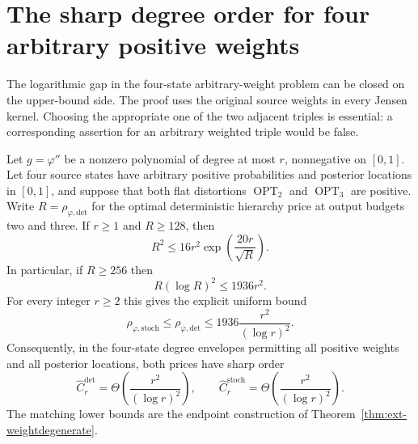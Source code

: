 \section{The sharp degree order for four arbitrary positive weights}
\label{sec:weighted-sharp}

The logarithmic gap in the four-state arbitrary-weight problem can be
closed on the upper-bound side. The proof uses the original source weights
in every Jensen kernel. Choosing the appropriate one of the two adjacent
triples is essential: a corresponding assertion for an arbitrary weighted
triple would be false.

\begin{theorem}
\label{thm:weighted-sharp}
Let $g=\varphi''$ be a nonzero polynomial of degree at most $r$, nonnegative
on $[0,1]$. Let four source states have arbitrary positive probabilities
and posterior locations in $[0,1]$, and suppose that both flat distortions
$\operatorname{OPT}_2$ and $\operatorname{OPT}_3$ are positive. Write
$R=\rho_{\varphi,\mathrm{det}}$ for the optimal deterministic hierarchy
price at output budgets two and three.
If $r\ge1$ and $R\ge128$, then
\begin{equation}
 R^2\le16r^2\exp\left(\frac{20r}{\sqrt R}\right).
 \label{eq:weighted-implicit}
\end{equation}
In particular, if $R\ge256$ then
\begin{equation}
 R(\log R)^2\le1936r^2.
 \label{eq:weighted-Rlog}
\end{equation}
For every integer $r\ge2$ this gives the explicit uniform bound
\begin{equation}
 \rho_{\varphi,\mathrm{stoch}}
 \le\rho_{\varphi,\mathrm{det}}
 \le1936\frac{r^2}{(\log r)^2}.
 \label{eq:weighted-sharp-upper}
\end{equation}
Consequently, in the four-state degree envelopes permitting all positive
weights and all posterior locations, both prices have sharp order
\[
 \widehat C_r^{\mathrm{det}}
 =\Theta\!\left(\frac{r^2}{(\log r)^2}\right),\qquad
 \widehat C_r^{\mathrm{stoch}}
 =\Theta\!\left(\frac{r^2}{(\log r)^2}\right).
\]
The matching lower bounds are the endpoint construction of
Theorem~\ref{thm:ext-weightdegenerate}.
\end{theorem}

